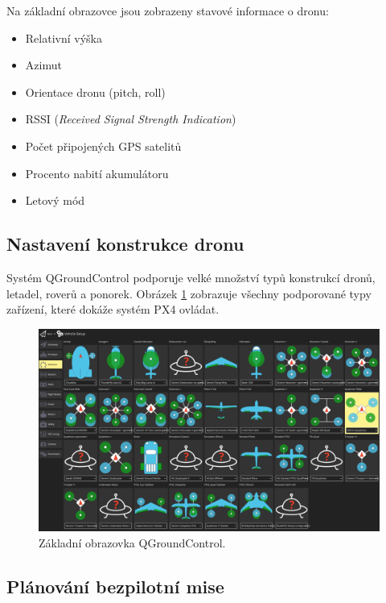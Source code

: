 Na základní obrazovce jsou zobrazeny stavové informace o dronu:

\begin{itemize}
    \item Relativní výška
    \item Azimut
    \item Orientace dronu (pitch, roll)
    \item RSSI (\textit{Received Signal Strength Indication})
    \item Počet připojených GPS satelitů
    \item Procento nabití akumulátoru
    \item Letový mód
\end{itemize}

\subsection{Nastavení konstrukce dronu}

Systém QGroundControl podporuje velké množství typů konstrukcí dronů, letadel, roverů a ponorek. Obrázek \ref{fig:QGC1} zobrazuje všechny podporované typy zařízení, které dokáže systém PX4 ovládat.

\begin{figure}[!ht]
    \begin{center}
        \includegraphics[scale=0.31]{obrazky/QG2}
    \end{center}
    \caption[Základní obrazovka QGroundControl]{Základní obrazovka QGroundControl.}
    \label{fig:QGC1}
\end{figure}

\subsection{Plánování bezpilotní mise}
\label{subs:planovani}

